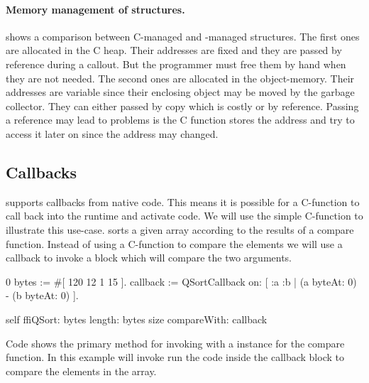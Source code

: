 \paragraph{Memory management of structures.}
 shows a comparison between C-managed and \PH-managed structures.
The first ones are allocated in the C heap.
Their addresses are fixed and they are passed by reference during a callout.
But the programmer must free them by hand when they are not needed.
The second ones are allocated in the \PH object-memory.
Their addresses are variable since their enclosing object may be moved by the garbage collector.
They can either passed by copy which is costly or by reference.
Passing a reference may lead to problems is the C function stores the address and try to access it later on since the address may changed.


\subsection{Callbacks}

\NB supports callbacks from native code.
This means it is possible for a C-function to call back into the \PH runtime and activate code.
We will use the simple  C-function to illustrate this use-case.
 sorts a given array according to the results of a compare function.
Instead of using a C-function to compare the elements we will use a callback to invoke a \PH block which will compare the two arguments.
%
\begin{stcode}[
	label={lst:calloutWithCallback},
	caption={Example of callout passing a callback for \ttt{qsort}}]{0}
bytes := #[ 120 12 1 15 ].
callback := QSortCallback on: [ :a :b |
				(a byteAt: 0) - (b byteAt: 0) ].

self ffiQSort: bytes
	 length: bytes size
	 compareWith: callback
\end{stcode}
%
Code  shows the primary \PH method for invoking  with a  instance for the compare function.
In this example  will invoke run the \PH code inside the callback block to compare the elements in the  array.

